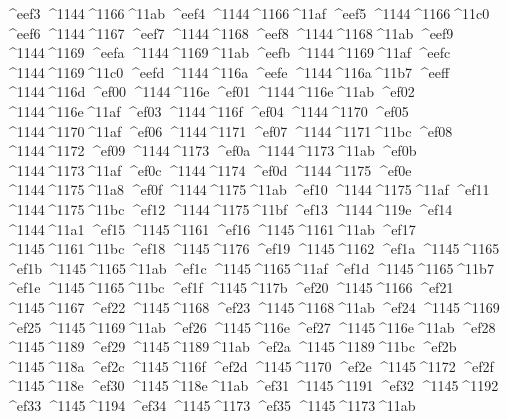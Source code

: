 \checkit ^^^^eef3 ^^^^1144^^^^1166^^^^11ab
\checkit ^^^^eef4 ^^^^1144^^^^1166^^^^11af
\checkit ^^^^eef5 ^^^^1144^^^^1166^^^^11c0
\checkit ^^^^eef6 ^^^^1144^^^^1167
\checkit ^^^^eef7 ^^^^1144^^^^1168
\checkit ^^^^eef8 ^^^^1144^^^^1168^^^^11ab
\checkit ^^^^eef9 ^^^^1144^^^^1169
\checkit ^^^^eefa ^^^^1144^^^^1169^^^^11ab
\checkit ^^^^eefb ^^^^1144^^^^1169^^^^11af
\checkit ^^^^eefc ^^^^1144^^^^1169^^^^11c0
\checkit ^^^^eefd ^^^^1144^^^^116a
\checkit ^^^^eefe ^^^^1144^^^^116a^^^^11b7
\checkit ^^^^eeff ^^^^1144^^^^116d
\checkit ^^^^ef00 ^^^^1144^^^^116e
\checkit ^^^^ef01 ^^^^1144^^^^116e^^^^11ab
\checkit ^^^^ef02 ^^^^1144^^^^116e^^^^11af
\checkit ^^^^ef03 ^^^^1144^^^^116f
\checkit ^^^^ef04 ^^^^1144^^^^1170
\checkit ^^^^ef05 ^^^^1144^^^^1170^^^^11af
\checkit ^^^^ef06 ^^^^1144^^^^1171
\checkit ^^^^ef07 ^^^^1144^^^^1171^^^^11bc
\checkit ^^^^ef08 ^^^^1144^^^^1172
\checkit ^^^^ef09 ^^^^1144^^^^1173
\checkit ^^^^ef0a ^^^^1144^^^^1173^^^^11ab
\checkit ^^^^ef0b ^^^^1144^^^^1173^^^^11af
\checkit ^^^^ef0c ^^^^1144^^^^1174
\checkit ^^^^ef0d ^^^^1144^^^^1175
\checkit ^^^^ef0e ^^^^1144^^^^1175^^^^11a8
\checkit ^^^^ef0f ^^^^1144^^^^1175^^^^11ab
\checkit ^^^^ef10 ^^^^1144^^^^1175^^^^11af
\checkit ^^^^ef11 ^^^^1144^^^^1175^^^^11bc
\checkit ^^^^ef12 ^^^^1144^^^^1175^^^^11bf
\checkit ^^^^ef13 ^^^^1144^^^^119e
\checkit ^^^^ef14 ^^^^1144^^^^11a1
\checkit ^^^^ef15 ^^^^1145^^^^1161
\checkit ^^^^ef16 ^^^^1145^^^^1161^^^^11ab
\checkit ^^^^ef17 ^^^^1145^^^^1161^^^^11bc
\checkit ^^^^ef18 ^^^^1145^^^^1176
\checkit ^^^^ef19 ^^^^1145^^^^1162
\checkit ^^^^ef1a ^^^^1145^^^^1165
\checkit ^^^^ef1b ^^^^1145^^^^1165^^^^11ab
\checkit ^^^^ef1c ^^^^1145^^^^1165^^^^11af
\checkit ^^^^ef1d ^^^^1145^^^^1165^^^^11b7
\checkit ^^^^ef1e ^^^^1145^^^^1165^^^^11bc
\checkit ^^^^ef1f ^^^^1145^^^^117b
\checkit ^^^^ef20 ^^^^1145^^^^1166
\checkit ^^^^ef21 ^^^^1145^^^^1167
\checkit ^^^^ef22 ^^^^1145^^^^1168
\checkit ^^^^ef23 ^^^^1145^^^^1168^^^^11ab
\checkit ^^^^ef24 ^^^^1145^^^^1169
\checkit ^^^^ef25 ^^^^1145^^^^1169^^^^11ab
\checkit ^^^^ef26 ^^^^1145^^^^116e
\checkit ^^^^ef27 ^^^^1145^^^^116e^^^^11ab
\checkit ^^^^ef28 ^^^^1145^^^^1189
\checkit ^^^^ef29 ^^^^1145^^^^1189^^^^11ab
\checkit ^^^^ef2a ^^^^1145^^^^1189^^^^11bc
\checkit ^^^^ef2b ^^^^1145^^^^118a
\checkit ^^^^ef2c ^^^^1145^^^^116f
\checkit ^^^^ef2d ^^^^1145^^^^1170
\checkit ^^^^ef2e ^^^^1145^^^^1172
\checkit ^^^^ef2f ^^^^1145^^^^118e
\checkit ^^^^ef30 ^^^^1145^^^^118e^^^^11ab
\checkit ^^^^ef31 ^^^^1145^^^^1191
\checkit ^^^^ef32 ^^^^1145^^^^1192
\checkit ^^^^ef33 ^^^^1145^^^^1194
\checkit ^^^^ef34 ^^^^1145^^^^1173
\checkit ^^^^ef35 ^^^^1145^^^^1173^^^^11ab
